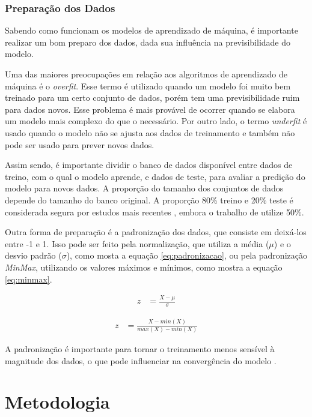 \documentclass[brazil,tf,epusp]{usp}  %
\begin{document}
\subsection{Preparação dos Dados}

Sabendo como funcionam os modelos de aprendizado de máquina, é importante realizar um bom preparo dos dados, dada sua influência na previsibilidade do modelo.

Uma das maiores preocupações em relação aos algoritmos de aprendizado de máquina é o \textit{overfit}. Esse termo é utilizado quando um modelo foi muito bem treinado para um certo conjunto de dados, porém tem uma previsibilidade ruim para dados novos. Esse problema é mais provável de ocorrer quando se elabora um modelo mais complexo do que o necessário. Por outro lado, o termo \textit{underfit} é usado quando o modelo não se ajusta aos dados de treinamento e também não pode ser usado para prever novos dados.

Assim sendo, é importante dividir o banco de dados disponível entre dados de treino, com o qual o modelo aprende, e dados de teste, para avaliar a predição do modelo para novos dados. A proporção do tamanho dos conjuntos de dados depende do tamanho do banco original. A proporção 80\% treino e 20\% teste é considerada segura por estudos mais recentes \cite{Bronshtein2017}, embora o trabalho de  utilize 50\%.

Outra forma de preparação é a padronização dos dados, que consiste em deixá-los entre -1 e 1. Isso pode ser feito pela normalização, que utiliza a média ($\mu$) e o desvio padrão ($\sigma$), como mosta a equação \ref{eq:padronizacao}, ou pela padronização \textit{MinMax}, utilizando os valores máximos e mínimos, como mostra a equação \ref{eq:minmax}.

\begin{align}
  z &= \frac{X - \mu}{\sigma}
  \label{eq:padronizacao}
\end{align}

\begin{align}
  z &= \frac{X - min(X)}{max(X) - min(X)}
  \label{eq:minmax}
\end{align}

A padronização é importante para tornar o treinamento menos sensível à magnitude dos dados, o que pode influenciar na convergência do modelo \cite{Raschka2014}.

\chapter{Metodologia}
\end{document}
